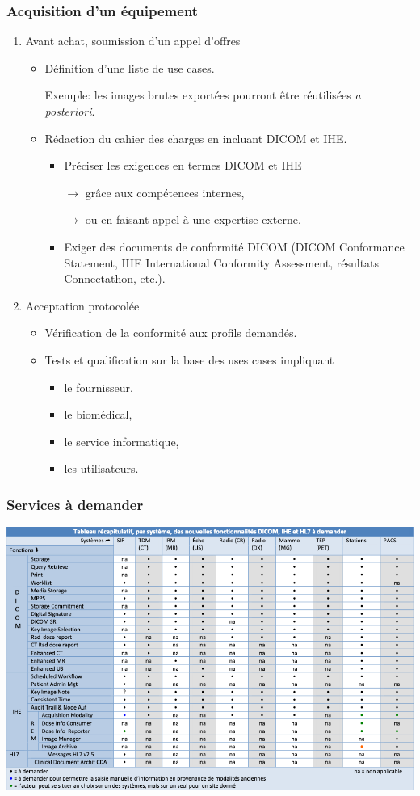 \frame
{
	\frametitle{Acquisition d'un \'equipement}
	\begin{enumerate}
		\item Avant achat, soumission d'un appel d'offres
		\begin{itemize}
			\item<2-> D\'efinition d'une liste de use cases.

                Exemple: les images brutes export\'ees pourront \^etre r\'eutilis\'ees \emph{a posteriori}.
			\item<3-> R\'edaction du cahier des charges en incluant DICOM et IHE.
			\begin{itemize}
				\item<3-> Pr\'eciser les exigences en termes DICOM et IHE
				
				$\rightarrow$ gr\^ace aux comp\'etences internes,
				
				$\rightarrow$ ou en faisant appel \`a une expertise externe.
				\item<4-> Exiger des documents de conformit\'e DICOM (DICOM Conformance Statement, IHE International Conformity Assessment, r\'esultats Connectathon, etc.).
			\end{itemize}
		\end{itemize}
		\item<5-> Acceptation protocol\'ee
		\begin{itemize}
			\item<6-> V\'erification de la conformit\'e aux profils demand\'es.
			\item<7-> Tests et qualification sur la base des uses cases impliquant
			\begin{itemize}
				\item<8-> le fournisseur,
				\item<9-> le biom\'edical,
				\item<10-> le service informatique,
				\item<11-> les utilisateurs.
			\end{itemize}
		\end{itemize}
	\end{enumerate}
}

\frame
{
	\frametitle{Services \`a demander}
	\begin{center}
		\includegraphics[width=\linewidth]{../figures/tableau-services.png}
	\end{center}
}